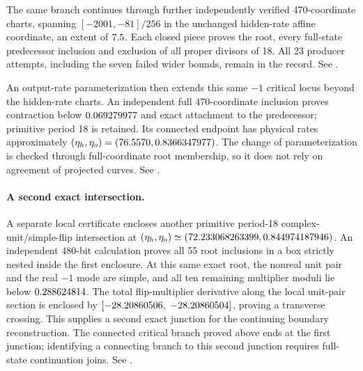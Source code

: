 \documentclass[11pt,letterpaper]{article}
\begin{document}
The same branch continues through \nSignedMarchCharts{} further independently
verified 470-coordinate charts, spanning $[-2001,-81]/256$ in the unchanged
hidden-rate affine coordinate, an extent of $7.5$. Each closed
piece proves the root, every full-state predecessor inclusion and exclusion
of all proper divisors of 18. All 23 producer attempts, including the seven
failed wider bounds, remain in the record. See
.

An output-rate parameterization then extends this same $-1$ critical locus beyond
the hidden-rate charts. An independent full 470-coordinate inclusion proves
contraction below $0.069279977$ and exact attachment to the
predecessor; primitive period 18 is retained. Its connected endpoint has
physical rates approximately
$(\eta_h,\eta_o)=(76.5570,0.8366347977)$.
The change of parameterization is checked through full-coordinate root
membership, so it does not rely on agreement of projected curves.
See .

\paragraph{A second exact intersection.}
A separate local certificate encloses another primitive period-18
complex-unit/simple-flip intersection at
$(\eta_h,\eta_o)\simeq(72.233068263399,0.844974187946)$.
An independent 480-bit calculation proves all 55 root inclusions in a box
strictly nested inside the first enclosure. At this same exact root, the
nonreal unit pair and the real $-1$ mode are simple, and all ten remaining
multiplier moduli lie below $0.288624814$.
The total flip-multiplier derivative along the local unit-pair section is
enclosed by $[-28.20860506,\ -28.20860504]$, proving a transverse crossing.
This supplies a second exact junction for the continuing boundary reconstruction.
The connected critical branch proved above ends at the first junction;
identifying a connecting branch to this second junction requires full-state continuation joins.
See .
\end{document}
